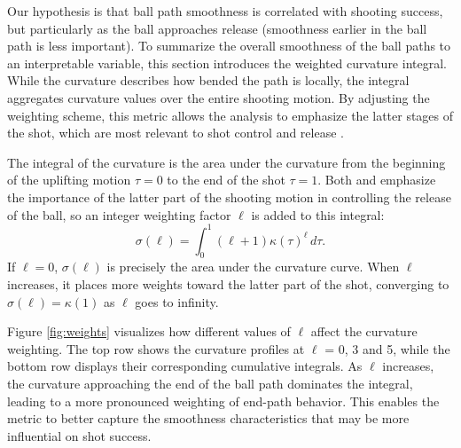 \documentclass{article}
\begin{document}
          Our hypothesis is that ball path smoothness is correlated with shooting success, but particularly as the ball approaches release (smoothness earlier in the ball path is less important). To summarize the overall smoothness of the ball paths to an interpretable variable, this section introduces the weighted curvature integral. While the curvature describes how bended the path is locally, the integral aggregates curvature values over the entire shooting motion. By adjusting the weighting scheme, this metric allows the analysis to emphasize the latter stages of the shot, which are most relevant to shot control and release \citep{button_examining_2003}.
    
          The integral of the curvature is the area under the curvature from the beginning of the uplifting motion \(\tau = 0\) to the end of the shot \(\tau = 1\). Both \citet{button_examining_2003} and \citet{slegers_role_2024} emphasize the importance of the latter part of the shooting motion in controlling the release of the ball, so an integer weighting factor $\ell$ is added to this integral:
          \[
            \sigma(\ell) = \int_{0}^{1} (\ell + 1) \kappa(\tau)^\ell \, d\tau.
          \]
          If \(\ell = 0\), \(\sigma(\ell)\) is precisely the area under the curvature curve. When $\ell$ increases, it places more weights toward the latter part of the shot, converging to \(\sigma(\ell) = \kappa(1)\) as $\ell$ goes to infinity. 
    
          Figure \ref{fig:weights} visualizes how different values of $\ell$ affect the curvature weighting. The top row shows the curvature profiles at $\ell$ = 0, 3 and 5, while the bottom row displays their corresponding cumulative integrals. As $\ell$ increases, the curvature approaching the end of the ball path dominates the integral, leading to a more pronounced weighting of end-path behavior. This enables the metric to better capture the smoothness characteristics that may be more influential on shot success.
\end{document}
